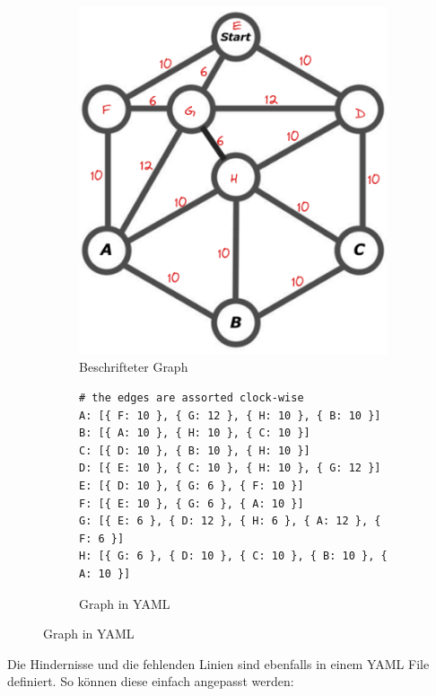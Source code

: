 \begin{figure}[H]
\begin{subfigure}{0.275\textwidth}
\includegraphics[width=0.95\linewidth]{img/graph_with_weighted_edges.png} 
\caption{Beschrifteter Graph}
\label{fig:labeled-graph}
\end{subfigure}
\begin{subfigure}{0.720\textwidth}
\begin{footnotesize}
\begin{verbatim}
# the edges are assorted clock-wise
A: [{ F: 10 }, { G: 12 }, { H: 10 }, { B: 10 }]
B: [{ A: 10 }, { H: 10 }, { C: 10 }]
C: [{ D: 10 }, { B: 10 }, { H: 10 }]
D: [{ E: 10 }, { C: 10 }, { H: 10 }, { G: 12 }]
E: [{ D: 10 }, { G: 6 }, { F: 10 }]
F: [{ E: 10 }, { G: 6 }, { A: 10 }]
G: [{ E: 6 }, { D: 12 }, { H: 6 }, { A: 12 }, { F: 6 }]
H: [{ G: 6 }, { D: 10 }, { C: 10 }, { B: 10 }, { A: 10 }]
\end{verbatim}
\end{footnotesize}
\caption{Graph in YAML}
\label{fig:graph-yaml}
\end{subfigure}
\end{figure}

Die Hindernisse und die fehlenden Linien sind ebenfalls in einem YAML File definiert. So können diese einfach angepasst werden:

